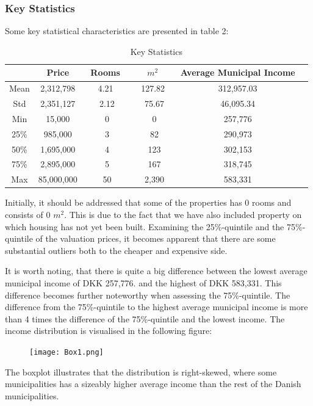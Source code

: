 \documentclass[12pt,a4paper]{article}
\begin{document}
\subsubsection{Key Statistics}
Some key statistical characteristics are presented in table 2:
\begin{table}[H]
\begin{center}
\caption{Key Statistics\label{time}}
\begin{tabular}{| c | c | c | c | c | c |} 
\hline
   & Price & \, Rooms \ & \ $m^2$ \ & Average Municipal Income \\ \hline
   Mean & 2,312,798 & \ 4.21 \  & \ 127.82 \ & 312,957.03 \\ \hline
   Std & 2,351,127 & 2.12 & 75.67 & 46,095.34 \\ \hline
   Min & 15,000 & 0 & 0 & 257,776 \\ \hline
   25\% & 985,000 & 3 & 82 & 290,973 \\ \hline
   50\% & 1,695,000 & 4 & 123 & 302,153 \\ \hline
   75\% & 2,895,000 & 5 & 167 & 318,745 \\ \hline
   Max & 85,000,000 & 50 & 2,390 & 583,331 \\ \hline
\end{tabular}
\end{center}
\end{table} 
Initially, it should be addressed that some of the properties has 0 rooms and consists of 0 $m^2$.  This is due to the fact that we have also included property on which housing has not yet been built. Examining the 25\%-quintile and the 75\%-quintile of the valuation prices, it becomes apparent that there are some substantial outliers both to the cheaper and expensive side.


It is worth noting, that there is quite a big difference between the lowest average municipal income of DKK 257,776. and the highest of DKK 583,331. This difference becomes further noteworthy when assessing the 75\%-quintile. The difference from the 75\%-quintile to the highest average municipal income is more than 4 times the difference of the 75\%-quintile and the lowest income. The income distribution is visualised in the following figure:
\begin{figure}[H]
  \centering
   \caption{}
   \texttt{[image: Box1.png]} 
  \label{fig:}
\end{figure}
The boxplot illustrates that the distribution is right-skewed, where some municipalities has a sizeably higher average income than the rest of the Danish municipalities. 
\end{document}
